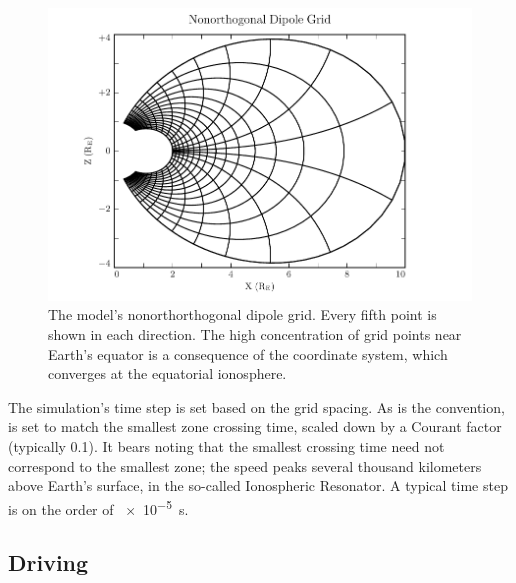 \begin{figure}[!htb]
    \centering
    \includegraphics[width=\textwidth]{figures/grid.pdf}
    \caption[Nonorthogonal Dipole Grid]{
      The model's nonorthorthogonal dipole grid. Every fifth point is shown in each direction. The high concentration of grid points near Earth's equator is a consequence of the coordinate system, which converges at the equatorial ionosphere. 
    }
    \label{fig_grid}
\end{figure}

The simulation's time step is set based on the grid spacing. As is the convention, \dt is set to match the smallest \Alfven zone crossing time, scaled down by a Courant factor (typically 0.1). It bears noting that the smallest crossing time need not correspond to the smallest zone; the \Alfven speed peaks several thousand kilometers above Earth's surface, in the so-called Ionospheric \Alfven Resonator\cite{lysak_2013}. A typical time step is on the order of \SI{e-5}{\second}. 

\subsection{Driving}
  \label{sec_driving}


